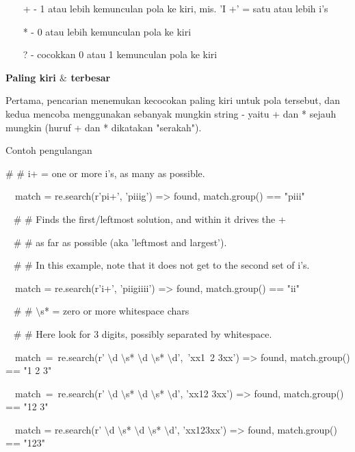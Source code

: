 \begin {enumerate}
\begin {enumerate}
\noindent
~~~ + - 1 atau lebih kemunculan pola ke kiri, mis. 'I +' = satu atau lebih i's \par
\noindent
~~~ * - 0 atau lebih kemunculan pola ke kiri \par
\noindent
~~~ ? - cocokkan 0 atau 1 kemunculan pola ke kiri \par
\vspace{12pt}
\vspace{14pt}
\noindent
{\fontsize{14pt}{14pt}\selectfont \textbf{Paling kiri  $  \&  $ terbesar} \\} \par
Pertama, pencarian menemukan kecocokan paling kiri untuk pola tersebut, dan kedua mencoba menggunakan sebanyak mungkin string - yaitu + dan * sejauh mungkin (huruf + dan * dikatakan "serakah"). \par
\noindent
Contoh pengulangan \par
\vspace{12pt}
\noindent
 $  \#  $ $  \#  $ i+ = one or more i's, as many as possible. \par
\noindent
~~match = re.search(r'pi+', 'piiig') =>  found, match.group() == "piii" \par
\vspace{12pt}
\noindent
~  $  \#  $ $  \#  $ Finds the first/leftmost solution, and within it drives the + \par
\noindent
~  $  \#  $ $  \#  $ as far as possible (aka 'leftmost and largest'). \par
\noindent
~  $  \#  $ $  \#  $ In this example, note that it does not get to the second set of i's. \par
\noindent
~~match = re.search(r'i+', 'piigiiii') =>  found, match.group() == "ii" \par
\vspace{12pt}
\noindent
~  $  \#  $ $  \#  $  $  \setminus  $s* = zero or more whitespace chars \par
\noindent
~  $  \#  $ $  \#  $ Here look for 3 digits, possibly separated by whitespace. \par
\noindent
~~match~=~re.search(r' $  \setminus  $d $  \setminus  $s* $  \setminus  $d $  \setminus  $s* $  \setminus  $d',~'xx1~2   3xx') =>  found, match.group() == "1 2   3" \par
\noindent
~~match~=~re.search(r' $  \setminus  $d $  \setminus  $s* $  \setminus  $d $  \setminus  $s* $  \setminus  $d', 'xx12  3xx') =>  found, match.group() == "12  3" \par
\noindent
~~match = re.search(r' $  \setminus  $d $  \setminus  $s* $  \setminus  $d $  \setminus  $s* $  \setminus  $d', 'xx123xx') =>  found, match.group() == "123" \par

\end{enumerate}
\end{enumerate}
